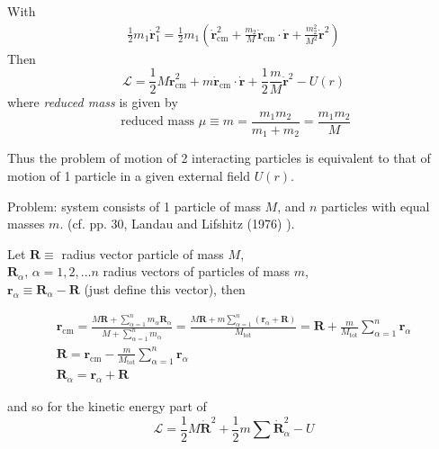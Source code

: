 \documentclass[10pt]{amsart}
\begin{document}
\begin{multicols*}{2}
With
\[
\begin{gathered} 
\frac{1}{2} m_1 \dot{\mathbf{r}}_1^2 = \frac{1}{2} m_1 \left( \dot{\mathbf{r}}_{\text{cm}}^2 + \frac{m_2}{M} \dot{\mathbf{r}}_{\text{cm}} \cdot \dot{\mathbf{r}} + \frac{m_2^2}{M^2} \dot{\mathbf{r}}^2 \right) 
\end{gathered} 
\]
Then
\begin{equation}
 \mathcal{L} = \frac{1}{2} M \dot{\mathbf{r}}_{\text{cm}}^2 + m \dot{\mathbf{r}}_{\text{cm}} \cdot \dot{ \mathbf{r}} + \frac{1}{2} \frac{m}{M} \dot{\mathbf{r}}^2 - U(r)
\end{equation}
where \emph{reduced mass} is given by
\begin{equation}
\text{ reduced mass } \mu \equiv m = \frac{ m_1 m_2 }{m_1 + m_2} = \frac{m_1 m_2}{M}
\end{equation}

Thus the problem of motion of 2 interacting particles is equivalent to that of motion of 1 particle in a given external field $U(r)$.  

Problem: system consists of 1 particle of mass $M$, and $n$ particles with equal masses $m$.  (cf. pp. 30, Landau and Lifshitz (1976) \cite{LLandauELifshitz1976}).  

Let $\mathbf{R} \equiv$ radius vector particle of mass $M$, \\
$\mathbf{R}_{\alpha}$, $\alpha = 1,2, \dots n$ radius vectors of particles of mass $m$, \\
$\mathbf{r}_{\alpha} \equiv \mathbf{R}_{\alpha} - \mathbf{R}$ (just define this vector), then

\[
\begin{gathered}
\mathbf{r}_{\text{cm}} = \frac{ M \mathbf{R} + \sum_{\alpha = 1}^n m_{\alpha} \mathbf{R}_{\alpha} }{ M + \sum_{\alpha = 1}^n m_{\alpha} } = \frac{M \mathbf{R} + m \sum_{\alpha = 1}^n ( \mathbf{r}_{\alpha} + \mathbf{R}) }{ M_{\text{tot}} } = \mathbf{R} + \frac{m}{ M_{\text{tot}}} \sum_{\alpha = 1}^n \mathbf{r}_{\alpha} \\
\mathbf{R} = \mathbf{r}_{\text{cm}} - \frac{m}{ M_{\text{tot}}}  \sum_{\alpha = 1}^n \mathbf{r}_{\alpha} \\ 
	\mathbf{R}_{\alpha} = \mathbf{r}_{\alpha} + \mathbf{R} 
	\end{gathered}
	\]
	

and so for the kinetic energy part of 
\[
\mathcal{L} = \frac{1}{2} M \dot{\mathbf{R}}^2 + \frac{1}{2} m \sum \dot{\mathbf{R}}_{\alpha}^2 - U
\]


\end{multicols*}
\end{document}
